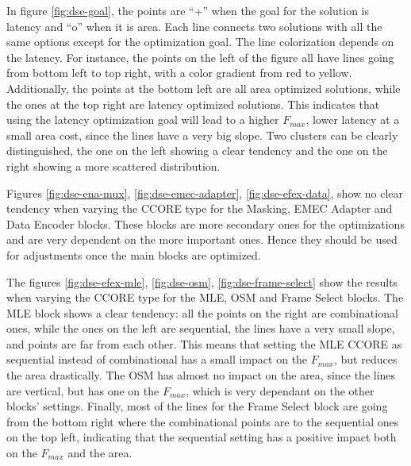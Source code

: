 \begin{itemize}
In figure \ref{fig:dse-goal}, the points are ``+'' when the goal for the solution is latency and ``o'' when it is area. Each line connects two solutions with all the same options except for the optimization goal. The line colorization depends on the latency. For instance, the points on the left of the figure all have lines going from bottom left to top right, with a color gradient from red to yellow. Additionally, the points at the bottom left are all area optimized solutions, while the ones at the top right are latency optimized solutions. This indicates that using the latency optimization goal will lead to a higher \(F_{max}\), lower latency at a small area cost, since the lines have a very big slope. Two clusters can be clearly distinguished, the one on the left showing a clear tendency and the one on the right showing a more scattered distribution.

Figures \ref{fig:dse-ena-mux}, \ref{fig:dse-emec-adapter}, \ref{fig:dse-efex-data}, show no clear tendency when varying the CCORE type for the Masking, EMEC Adapter and Data Encoder blocks. These blocks are more secondary ones for the optimizations and are very dependent on the more important ones. Hence they should be used for adjustments once the main blocks are optimized.

The figures \ref{fig:dse-efex-mle}, \ref{fig:dse-osm}, \ref{fig:dse-frame-select} show the results when varying the CCORE type for the MLE, OSM and Frame Select blocks. The MLE block shows a clear tendency: all the points on the right are combinational ones, while the ones on the left are sequential, the lines have a very small slope, and points are far from each other. This means that setting the MLE CCORE as sequential instead of combinational has a small impact on the \(F_{max}\), but reduces the area drastically. The OSM has almost no impact on the area, since the lines are vertical, but has one on the \(F_{max}\), which is very dependant on the other blocks' settings. Finally, most of the lines for the Frame Select block are going from the bottom right where the combinational points are to the sequential ones on the top left, indicating that the sequential setting has a positive impact both on the \(F_{max}\) and the area.


\end{itemize}
